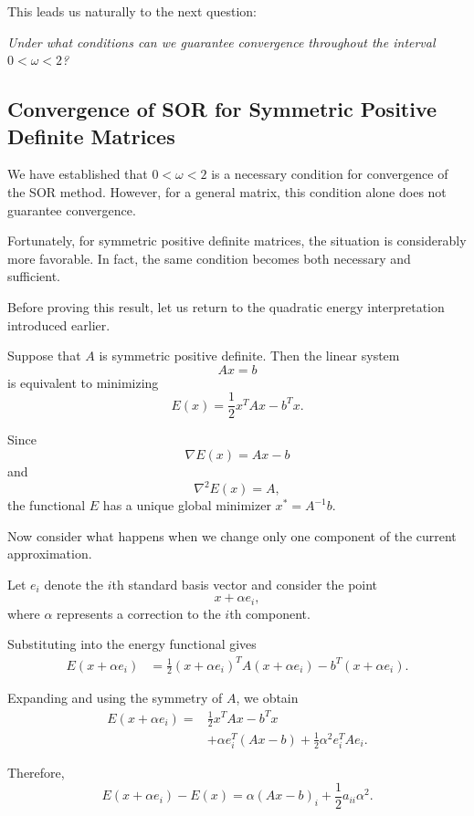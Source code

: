 \documentclass[11pt,a4paper]{article}
\theoremstyle{definition}
\theoremstyle{remark}
\begin{document}
This leads us naturally to the next question:

\emph{Under what conditions can we guarantee
convergence throughout the interval $0<\omega<2$?}


\subsection{Convergence of SOR for Symmetric Positive Definite Matrices}

We have established that $0<\omega<2$ is a necessary
condition for convergence of the SOR method. However,
for a general matrix, this condition alone does not
guarantee convergence.

Fortunately, for symmetric positive definite matrices,
the situation is considerably more favorable. In fact,
the same condition becomes both necessary and sufficient.

Before proving this result, let us return to the
quadratic energy interpretation introduced earlier.

Suppose that $A$ is symmetric positive definite.
Then the linear system
\[
    Ax=b
\]
is equivalent to minimizing
\begin{equation}
    E(x)=\frac12 x^T A x-b^T x.
    \label{eq:sor_energy}
\end{equation}

Since
\[
    \nabla E(x)=Ax-b
\]
and
\[
    \nabla^2 E(x)=A,
\]
the functional $E$ has a unique global minimizer
$x^*=A^{-1}b$.

Now consider what happens when we change only one
component of the current approximation.

Let $e_i$ denote the $i$th standard basis vector
and consider the point
\[
    x+\alpha e_i,
\]
where $\alpha$ represents a correction to the
$i$th component.

Substituting into the energy functional gives
\[
\begin{aligned}
E(x+\alpha e_i)
&=
\frac12(x+\alpha e_i)^T
A(x+\alpha e_i)
-b^T(x+\alpha e_i).
\end{aligned}
\]

Expanding and using the symmetry of $A$,
we obtain
\[
\begin{aligned}
E(x+\alpha e_i)
={}&
\frac12x^TAx-b^Tx
\\
&+\alpha e_i^T(Ax-b)
+\frac12\alpha^2e_i^TAe_i.
\end{aligned}
\]

Therefore,
\begin{equation}
    \boxed{
    E(x+\alpha e_i)-E(x)
    =
    \alpha(Ax-b)_i
    +\frac12a_{ii}\alpha^2.
    }
    \label{eq:sor_energy_change}
\end{equation}
\end{document}
